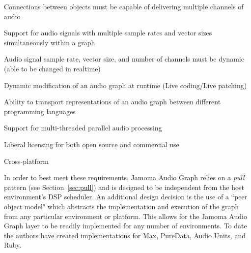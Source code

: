 \documentclass[twoside,a4paper]{article}
\newenvironment{packed_item}{
\begin{itemize}
  \setlength{\itemsep}{1pt}
  \setlength{\parskip}{0pt}
  \setlength{\parsep}{0pt}
}{\end{itemize}}
\begin{document}
\begin{packed_item}
	\item{Connections between objects must be capable of delivering multiple channels of audio}
	\item{Support for audio signals with multiple sample rates and vector sizes simultaneously within a graph}
	\item{Audio signal sample rate, vector size, and number of channels must be dynamic (able to be changed in realtime)}
	\item{Dynamic modification of an audio graph at runtime (Live coding/Live patching)}    
	\item{Ability to transport representations of an audio graph between different programming languages}
	\item{Support for multi-threaded parallel audio processing}
	\item{Liberal licensing for both open source and commercial use}
	\item{Cross-platform}
\end{packed_item}	

In order to best meet these requirements, Jamoma Audio Graph relies on a \emph{pull} pattern (see Section~\ref{sec:pull}) and is designed to be independent from the host environment's DSP scheduler.
An additional design decision is the use of a ``peer object model" which abstracts the implementation and execution of the graph from any particular environment or platform.  
This allows for the Jamoma Audio Graph layer to be readily implemented for any number of environments.
To date the authors have created implementations for Max, PureData, Audio Units, and Ruby.


%
%  
%
\end{document}

